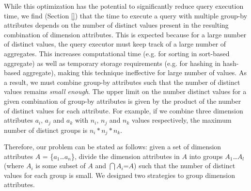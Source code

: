   While this optimization has the potential to significantly reduce query
  execution time, we find (Section \ref{}) that the time to execute a query
  with multiple group-by attributes depends on the number of distinct values
  present in the resulting combination of dimension attributes.
  This is expected because for a large number of distinct values, the query
  executor must keep track of a large number of aggregates. 
  This increases computational time (e.g. for sorting in sort-based aggregate)
  as well as temporary storage requirements (e.g. for hashing in hash-based
  aggregate), making this technique ineffective for large number of values.
  As a result, we must combine group-by attributes such that the number of
  distinct values remains {\it small enough}. 
  The upper limit on the number distinct values for a given combination of
  group-by attributes is given by the product of the number of distinct values
  for each attribute.
  For example, if we combine three dimension attributes $a_i$, $a_j$ and $a_k$
  with $n_i$, $n_j$ and $n_k$ values respectively, the maximum number of
  distinct groups is $n_i\ast n_j \ast n_k$.
  
  Therefore, our problem can be stated as follows:
  given a set of dimension attributes $A$ = \{$a_1$\ldots$a_n$\}, divide the
  dimension attributes in $A$ into groups $A_1$\ldots$A_l$ (where $A_i$ is some
  subset of $A$ and $\bigcap A_i$=$A$) such that the number of distinct values
  for each group is small. We designed two strategies to group dimension
  attributes.
  
